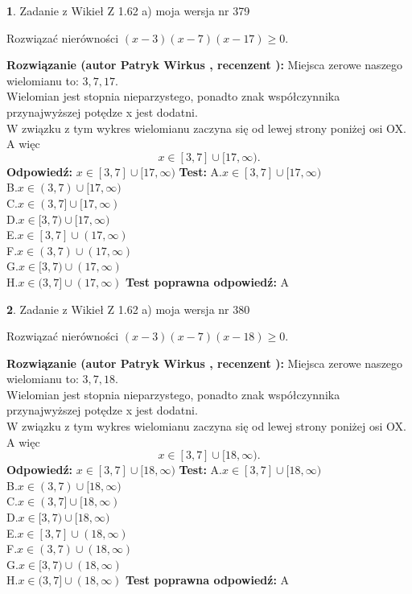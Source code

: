 \documentclass[12pt, a4paper]{article}
\theoremstyle{definition} %
\newtheorem{zad}{}
\newcommand{\zadStart}[1]{\begin{zad}#1\newline}
\newcommand{\zadStop}{\end{zad}}
\newcommand{\rozwStart}[2]{\noindent \textbf{Rozwiązanie (autor #1 , recenzent #2): }\newline}
\newcommand{\rozwStop}{\newline}
\newcommand{\odpStart}{\noindent \textbf{Odpowiedź:}\newline}
\newcommand{\odpStop}{\newline}
\newcommand{\testStart}{\noindent \textbf{Test:}\newline}
\newcommand{\testStop}{\newline}
\newcommand{\kluczStart}{\noindent \textbf{Test poprawna odpowiedź:}\newline}
\newcommand{\kluczStop}{\newline}
\begin{document}
\zadStart{Zadanie z Wikieł Z 1.62 a) moja wersja nr 379}

Rozwiązać nierówności $(x-3)(x-7)(x-17)\ge0$.
\zadStop
\rozwStart{Patryk Wirkus}{}
Miejsca zerowe naszego wielomianu to: $3, 7, 17$.\\
Wielomian jest stopnia nieparzystego, ponadto znak współczynnika przy\linebreak najwyższej potędze x jest dodatni.\\ W związku z tym wykres wielomianu zaczyna się od lewej strony poniżej osi OX. A więc $$x \in [3,7] \cup [17,\infty).$$
\rozwStop
\odpStart
$x \in [3,7] \cup [17,\infty)$
\odpStop
\testStart
A.$x \in [3,7] \cup [17,\infty)$\\
B.$x \in (3,7) \cup [17,\infty)$\\
C.$x \in (3,7] \cup [17,\infty)$\\
D.$x \in [3,7) \cup [17,\infty)$\\
E.$x \in [3,7] \cup (17,\infty)$\\
F.$x \in (3,7) \cup (17,\infty)$\\
G.$x \in [3,7) \cup (17,\infty)$\\
H.$x \in (3,7] \cup (17,\infty)$
\testStop
\kluczStart
A
\kluczStop



\zadStart{Zadanie z Wikieł Z 1.62 a) moja wersja nr 380}

Rozwiązać nierówności $(x-3)(x-7)(x-18)\ge0$.
\zadStop
\rozwStart{Patryk Wirkus}{}
Miejsca zerowe naszego wielomianu to: $3, 7, 18$.\\
Wielomian jest stopnia nieparzystego, ponadto znak współczynnika przy\linebreak najwyższej potędze x jest dodatni.\\ W związku z tym wykres wielomianu zaczyna się od lewej strony poniżej osi OX. A więc $$x \in [3,7] \cup [18,\infty).$$
\rozwStop
\odpStart
$x \in [3,7] \cup [18,\infty)$
\odpStop
\testStart
A.$x \in [3,7] \cup [18,\infty)$\\
B.$x \in (3,7) \cup [18,\infty)$\\
C.$x \in (3,7] \cup [18,\infty)$\\
D.$x \in [3,7) \cup [18,\infty)$\\
E.$x \in [3,7] \cup (18,\infty)$\\
F.$x \in (3,7) \cup (18,\infty)$\\
G.$x \in [3,7) \cup (18,\infty)$\\
H.$x \in (3,7] \cup (18,\infty)$
\testStop
\kluczStart
A
\kluczStop
\end{document}
